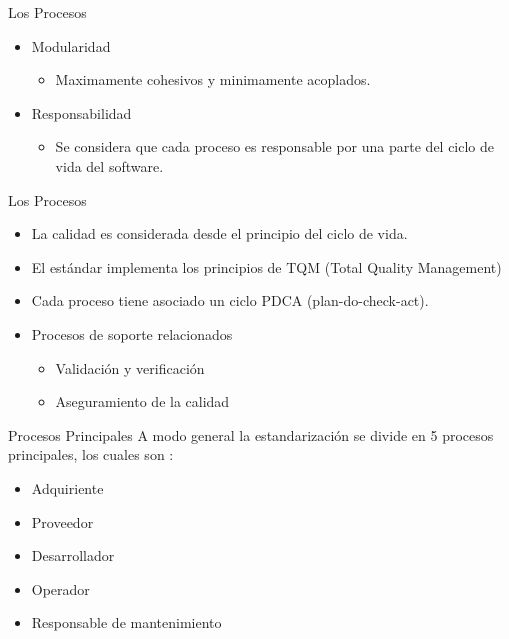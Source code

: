 \documentclass{beamer}
\begin{document}
			\begin{frame}{Los Procesos}
				\begin{itemize}
				 	\item Modularidad\\
				 	\begin{itemize}
				 		\item Maximamente cohesivos y minimamente acoplados.
				 	\end{itemize}	  
				 	\item Responsabilidad\\
				 	\begin{itemize}
				 		\item Se considera que cada proceso es responsable por una parte del ciclo de vida del software.\\
				 	\end{itemize}
				 \end{itemize}
			\end{frame}
			
			\begin{frame}{Los Procesos}
				\begin{itemize}
					\item La calidad es considerada desde el principio del ciclo de vida.
					\item El estándar implementa los principios de TQM (Total Quality Management)
					\item Cada proceso tiene asociado un ciclo PDCA (plan-do-check-act).
					\item Procesos de soporte relacionados
					\begin{itemize}
						\item Validación y verificación 
						\item Aseguramiento de la calidad
					\end{itemize}
				\end{itemize}
			\end{frame}
			
			\begin{frame}{Procesos Principales}
				A modo general la estandarización se divide en 5 procesos principales, los cuales son :  
				\begin{itemize}
					\item Adquiriente
					\item Proveedor
					\item Desarrollador
					\item Operador
					\item Responsable de mantenimiento
				\end{itemize}
			\end{frame}
			
\end{document}
